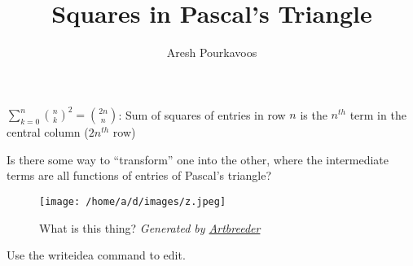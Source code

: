 \documentclass{article}
\begin{document}
\title{Squares in Pascal's Triangle}
\author{Aresh Pourkavoos}
\maketitle

$\sum\limits_{k=0}^{n}{n \choose k}^2 = {2n \choose n}$:
Sum of squares of entries in row $n$ is
the $n^{th}$ term in the central column ($2n^{th}$ row)

Is there some way to ``transform'' one into the other,
where the intermediate terms are all
functions of entries of Pascal's triangle?

\begin{figure}[H]
  \centering
  \texttt{[image: /home/a/d/images/z.jpeg]}
  \caption*{What is this thing? \textit{Generated by \href{https://artbreeder.com}{Artbreeder}}}
\end{figure}
Use the writeidea command to edit.
\end{document}

